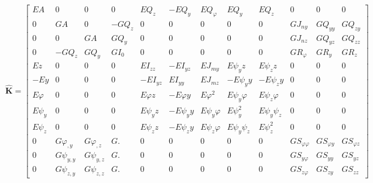 \begin{landscape}
\vspace*{\fill}
\begin{equation}
\hat{\bm{K}} = 
\left[\begin{array}{ccc|ccc|ccc|ccc}
EA & 0 & 0 & 0 & E Q_z & - E Q_y & E Q_{\varphi} & E Q_{y} & E Q_{z} & 0 & 0 & 0\\
0 & GA & 0 & - G Q_z & 0 & 0 & 0 & 0 & 0 & G J_{n y} & G Q_{y y} & G Q_{z y} \\
0 & 0 & GA & G Q_y & 0 & 0 & 0 & 0 & 0 & G J_{n z} & G Q_{y z} & G Q_{z z} \\ \hline
0 & - G Q_z & G Q_y & G I_0 & 0 & 0 & 0 & 0 & 0 & G R_{\varphi} &  G R_y & G R_z \\
E z & 0 & 0 & 0 & E I_{z z} & - E I_{y z} & E J_{my} & E \psi_{y} z & E \psi_{z} z & 0 & 0 & 0\\
- E y & 0 & 0 & 0 & - E I_{y z} & E I_{y y} & E J_{m z} & - E \psi_{y} y & - E \psi_{z} y & 0 & 0 & 0\\ \hline
E \varphi & 0 & 0 & 0 & E \varphi z & - E \varphi y & E \varphi^{2} & E \psi_{y} \varphi & E \psi_{z} \varphi & 0 & 0 & 0\\
E \psi_{y} & 0 & 0 & 0 & E \psi_{y} z & - E \psi_{y} y & E \psi_{y} \varphi & E \psi_{y}^{2} & E \psi_{y} \psi_{z} & 0 & 0 & 0\\
E \psi_{z} & 0 & 0 & 0 & E \psi_{z} z & - E \psi_{z} y & E \psi_{z} \varphi & E \psi_{y} \psi_{z} & E \psi_{z}^{2} & 0 & 0 & 0\\ \hline
0 & G \varphi_{,y} & G \varphi_{,z} & G . & 0 & 0 & 0 & 0 & 0 & G S_{\varphi \varphi} & G S_{\varphi y} & G S_{\varphi z} \\
0 & G \psi_{y,y} & G \psi_{y,z} & G . & 0 & 0 & 0 & 0 & 0 & G S_{y \varphi} & G S_{y y} & G S_{y z} \\
0 & G \psi_{z,y} & G \psi_{z,z} & G . & 0 & 0 & 0 & 0 & 0 & G S_{z \varphi} & G S_{zy} & G S_{zz}
\end{array}\right]
\label{eq:ks-isotropic}
\end{equation}
\vspace*{\fill}
\end{landscape}
